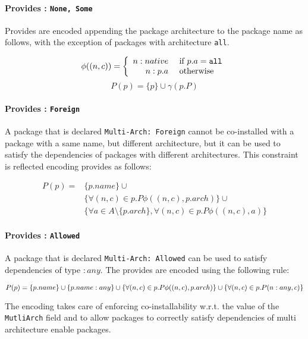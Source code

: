 \paragraph{Provides : \texttt{None, Some}}

Provides are encoded appending the package architecture
to the package name as follows, with the exception of packages with
architecture \texttt{all}.

\[
  \phi ((n,c)) = \left\{ 
    \begin{array}{rl}
      n:native &  \mbox{ if } p.a = \tt{all} \\
      n:p.a & \mbox{ otherwise }
    \end{array} 
  \right.
\]
\[
  P(p) = \{ p \} \cup \gamma(p.P)
\]

\paragraph{Provides : \texttt{Foreign}}

A package that is declared \texttt{Multi-Arch: Foreign} cannot be
co-installed with a package with a same name, but different
architecture, but it can be used to satisfy the dependencies of
packages with different architectures. This constraint is reflected 
encoding provides as follows:

\[
  \begin{array}{rl}
    P(p) = & \{ p.name \} \cup \\
           & \{ \forall (n,c) \in p.P \phi((n,c), p.arch) \} \cup \\
           & \{ \forall a \in A \setminus \{ p.arch \}, \forall (n,c) \in p.P \phi(( n,c),a) \}
   \end{array}
\]


\paragraph{Provides : \texttt{Allowed}}
A package that is declared \texttt{Multi-Arch: Allowed} can be used to 
satisfy dependencies of type $:any$. The provides are encoded using
the following rule:

\[
  P(p) = \{ p.name \} \cup \{ p.name:any \} \cup \\
  \{ \forall (n,c) \in p.P \phi(( n,c), p.arch) \} \cup \\
  \{ \forall (n,c) \in p.P ( n:any,c) \} 
\]

The encoding takes care of enforcing co-installability w.r.t. the value of the
\texttt{MutliArch} field and to allow packages to correctly satisfy
dependencies of multi architecture enable packages.



